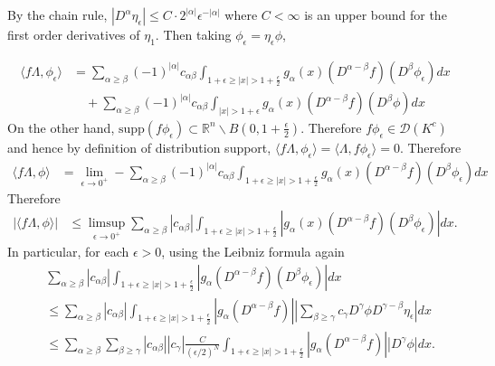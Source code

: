 \documentclass{exam}
\theoremstyle{problemstyle}
\newcommand{\1}[1]{\textbf{1}_{\left[#1\right]}} %
\def\R{\mathbb{R}} %
\begin{document}
\begin{questions}
\begin{parts}
\begin{solution}
    
    By the chain rule, $|D^{\alpha} \eta_{\epsilon}| \leq C\cdot 2^{|\alpha|}\epsilon^{-|\alpha|}$ where $C<\infty$ is an upper bound for the first order derivatives of $\eta_1$. Then taking $\phi_{\epsilon} = \eta_{\epsilon} \phi$,
    
    
    \begin{align*}
      \langle f\Lambda, \phi_{\epsilon}\rangle
      &= \sum_{\alpha \geq \beta }(-1)^{|\alpha|}c_{\alpha\beta}\int_{1+ \epsilon\geq |x|>1+\frac{\epsilon}{2}} g_{\alpha}(x)(D^{\alpha-\beta}f)(D^{\beta}\phi_{\epsilon})dx\\
      &\quad +  \sum_{\alpha \geq \beta }(-1)^{|\alpha|}c_{\alpha\beta}\int_{|x|>1+\epsilon} g_{\alpha}(x)(D^{\alpha-\beta}f)(D^{\beta}\phi)dx
    \end{align*}
    On the other hand, $\text{supp}(f\phi_{\epsilon}) \subset \R^n\backslash B(0,1+\frac{\epsilon}{2})$. Therefore $f\phi_{\epsilon}\in \mathcal{D}(K^{c})$ and hence by definition of distribution support, $\langle f\Lambda, \phi_{\epsilon}\rangle = \langle \Lambda, f\phi_{\epsilon}\rangle =0$. Therefore
    \begin{align*}
      \langle f\Lambda, \phi \rangle
      &= \lim_{\epsilon\to 0^{+}}-\sum_{\alpha \geq \beta }(-1)^{|\alpha|}c_{\alpha\beta}\int_{1+ \epsilon\geq |x|>1+\frac{\epsilon}{2}} g_{\alpha}(x)(D^{\alpha-\beta}f)(D^{\beta}\phi_{\epsilon})dx
    \end{align*}
    Therefore
    \begin{align} \label{dist-up-bound}
      |\langle f\Lambda, \phi \rangle|
      &\leq \limsup_{\epsilon\to 0^{+}}\sum_{\alpha \geq \beta } |c_{\alpha\beta}|\int_{1+ \epsilon\geq |x|>1+\frac{\epsilon}{2}} \left| g_{\alpha}(x)(D^{\alpha-\beta}f)(D^{\beta}\phi_{\epsilon})\right|dx.
    \end{align}
    In particular, for each $\epsilon>0$, using the Leibniz formula again
    \begin{align*}
    &\sum_{\alpha \geq \beta } |c_{\alpha\beta}|\int_{1+ \epsilon\geq |x|>1+\frac{\epsilon}{2}} \left| g_{\alpha}(D^{\alpha-\beta}f)(D^{\beta}\phi_{\epsilon})\right|dx \\
    &\leq \sum_{\alpha \geq \beta } |c_{\alpha\beta}|\int_{1+ \epsilon\geq |x|>1+\frac{\epsilon}{2}} \left| g_{\alpha}(D^{\alpha-\beta}f)\right|\left|\sum_{\beta\geq \gamma} c_{\gamma} D^{\gamma}\phi  D^{\gamma-\beta}\eta_{\epsilon} \right|dx \\
    &\leq \sum_{\alpha \geq \beta }  \sum_{\beta\geq \gamma} |c_{\alpha\beta}| |c_{\gamma}|\frac{C}{(\epsilon/2)^N}\int_{1+ \epsilon\geq |x|>1+\frac{\epsilon}{2}} \left| g_{\alpha}(D^{\alpha-\beta}f)\right| \left| D^{\gamma}\phi \right|dx.

\end{align*}
\end{solution}
\end{parts}
\end{questions}
\end{document}
